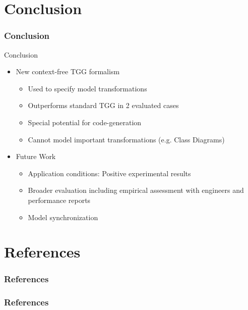 \documentclass[usenames,dvipsnames]{beamer}
\begin{document}
	\section{Conclusion}
	\begin{frame}
		\frametitle{Conclusion}
	\end{frame}
	
	\begin{frame}{Conclusion}
		\begin{itemize}
			\item New context-free TGG formalism
			\begin{itemize}
				\item Used to specify model transformations
				\item Outperforms standard TGG in 2 evaluated cases
				\item Special potential for code-generation
				\item Cannot model important transformations (e.g. Class Diagrams)
			\end{itemize}
			\pause
			\item Future Work
			\begin{itemize}
				\item Application conditions: Positive experimental results
				\item Broader evaluation including empirical assessment with engineers and performance reports
				\item Model synchronization
			\end{itemize}
		\end{itemize}
	\end{frame}
	
	\section{References}
	\begin{frame}
		\frametitle{References}
	\end{frame}
	
	\begin{frame}
		\frametitle{References}
		\tiny
		
		
	\end{frame}
\end{document}
